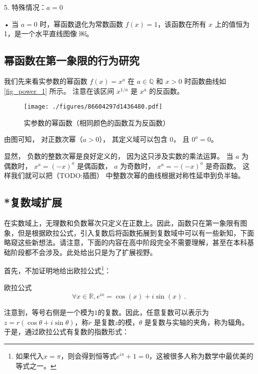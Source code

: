 5. 特殊情况：$a = 0$

	•	当 $a = 0$ 时，幂函数退化为常数函数 $f(x) = 1$，该函数在所有 $x$ 上的值恒为 1，是一个水平直线图像 ￼。



\subsection{幂函数在第一象限的行为研究}


我们先来看实参数的幂函数 $f(x) = x^a$ 在 $a\in\mathbb Q$ 和 $x > 0$ 时函数曲线如\autoref{fig_power_1} 所示。 注意在该区间 $x^{1/a}$ 是 $x^a$ 的反函数。

\begin{figure}[ht]
\centering
\texttt{[image: ./figures/86604297d1436480.pdf]}
\caption{实参数的幂函数（相同颜色的函数互为反函数）}\label{fig_power_1}
\end{figure}

由图可知， 对正数次幂（$a > 0$）， 其定义域可以包含 $0$， 且 $0^a = 0$。

显然， 负数的整数次幂是良好定义的， 因为这只涉及实数的乘法运算。 当 $a$ 为偶数时， $x^a = (-x)^a$ 是偶函数， $a$ 为奇数时， $x^a = -(-x)^a$ 是奇函数。 这样我们就可以把（TODO:插图） 中整数次幂的曲线根据对称性延申到负半轴。




\subsection{*复数域扩展}

在实数域上，无理数和负数幂次只定义在正数上。因此，函数只在第一象限有图象，但是根据欧拉公式，引入复数后将函数拓展到复数域中可以有一些新知，下面略窥这些新想法。请注意，下面的内容在高中阶段完全不需要理解，甚至在本科基础阶段都不会涉及。此处给出只是为了扩展视野。

首先，不加证明地给出欧拉公式\footnote{如果代入$x=\pi$，则会得到恒等式$e^{i\pi}+1=0$，这被很多人称为数学中最优美的等式之一。}：

\begin{theorem}{欧拉公式}
\begin{equation}
\forall x\in\mathbb{R},e^{ix} = \cos(x) + i\sin(x)~.
\end{equation}
\end{theorem}

注意到，等号右侧是一个模为$1$的复数。因此，任意复数可以表示为 $z = r (\cos \theta + i \sin \theta)$，称$r$ 是复数$z$的模，$\theta$ 是复数与实轴的夹角，称为辐角。于是，通过欧拉公式有复数的指数形式：

